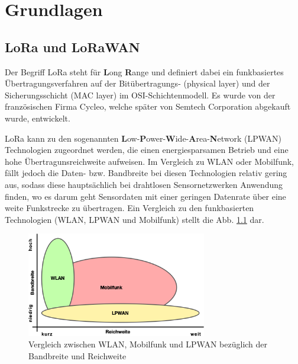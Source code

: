 
\chapter{Grundlagen} \label{Grundlagen}
\section{LoRa und LoRaWAN} \label{LoRa und LoRaWAN}

Der Begriff LoRa steht für \textbf{L}ong \textbf{R}ange und definiert dabei ein funkbasiertes Übertragungsverfahren auf der Bitübertragungs- (physical layer) und der Sicherungsschicht (MAC layer) im OSI-Schichtenmodell. Es wurde von der französischen Firma Cycleo, welche später von Semtech Corporation abgekauft wurde, entwickelt.

LoRa kann zu den sogenannten \textbf{L}ow-\textbf{P}ower-\textbf{W}ide-\textbf{A}rea-\textbf{N}etwork (LPWAN) Technologien zugeordnet werden, die einen energiesparsamen Betrieb und eine hohe Übertragunsreichweite aufweisen. Im Vergleich zu WLAN oder Mobilfunk, fällt jedoch die Daten- bzw. Bandbreite bei diesen Technologien relativ gering aus, sodass diese hauptsächlich bei drahtlosen Sensornetzwerken Anwendung finden, wo es darum geht Sensordaten mit einer geringen Datenrate über eine weite Funkstrecke zu übertragen. Ein Vergleich zu den funkbasierten Technologien (WLAN, LPWAN und Mobilfunk) stellt die Abb. \ref{fig:lpwan} dar.

\begin{figure}[h]
 \centering
 \includegraphics[width=0.7\textwidth]{pictures/lpwan-wlan-mobilfunk}
 \caption[Vergleich zwischen WLAN, Mobilfunk und LPWAN bezüglich der Bandbreite und Reichweite]{Vergleich zwischen WLAN, Mobilfunk und LPWAN bezüglich der Bandbreite und Reichweite \cite{lpwan2022}}
 \label{fig:lpwan}
\end{figure}


